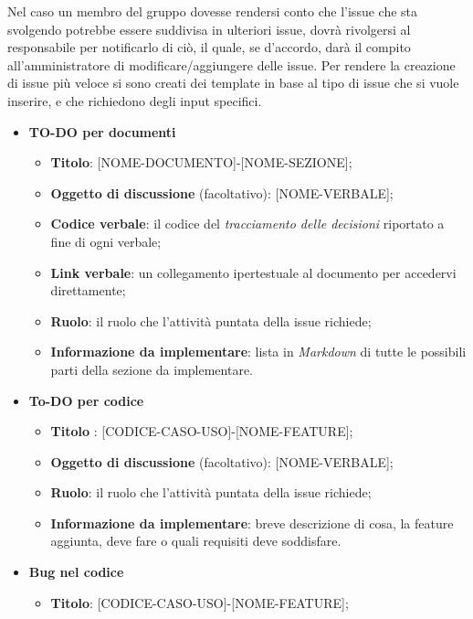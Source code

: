         Nel caso un membro del gruppo dovesse rendersi conto che l'issue che sta svolgendo potrebbe essere
        suddivisa in ulteriori issue, dovrà rivolgersi al responsabile per notificarlo di ciò, il quale, se d'accordo,
        darà il compito all'amministratore di modificare/aggiungere delle issue.
        Per rendere la creazione di issue più veloce si sono creati dei template in base al tipo di issue che si vuole inserire, e che richiedono degli input
        specifici.
        \begin{itemize}
            \item  \textbf{TO-DO per documenti}
            \begin{itemize}
                \item \textbf{Titolo}: [NOME-DOCUMENTO]-[NOME-SEZIONE];
                \item \textbf{Oggetto di discussione} (facoltativo): [NOME-VERBALE];
                \item \textbf{Codice verbale}: il codice del \textit{tracciamento delle decisioni} riportato a fine di ogni verbale;
                \item \textbf{Link verbale}: un collegamento ipertestuale al documento per accedervi direttamente;
                \item \textbf{Ruolo}: il ruolo che l'attività puntata della issue richiede;
                \item \textbf{Informazione da implementare}: lista in \textit{Markdown} di tutte le possibili parti della sezione da implementare.
            \end{itemize}
            \item  \textbf{To-DO per codice}
            \begin{itemize}
                \item \textbf{Titolo} : [CODICE-CASO-USO]-[NOME-FEATURE];
                \item \textbf{Oggetto di discussione} (facoltativo): [NOME-VERBALE];
                \item \textbf{Ruolo}: il ruolo che l'attività puntata della issue richiede;
                \item \textbf{Informazione da implementare}: breve descrizione di cosa, la feature aggiunta, deve fare o quali requisiti deve soddisfare.
            \end{itemize}
            \item  \textbf{Bug nel codice}
            \begin{itemize}
                \item \textbf{Titolo}: [CODICE-CASO-USO]-[NOME-FEATURE];

\end{itemize}
\end{itemize}
